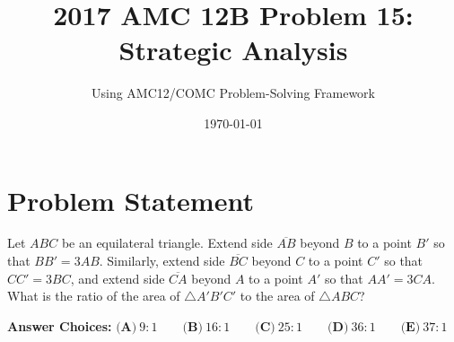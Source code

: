 \documentclass[11pt]{article}
\title{\textbf{2017 AMC 12B Problem 15: Strategic Analysis}}
\author{Using AMC12/COMC Problem-Solving Framework}
\date{\today}
\begin{document}
\maketitle

\section*{Problem Statement}
Let $ABC$ be an equilateral triangle. Extend side $\overline{AB}$ beyond $B$ to a point $B'$ so that $BB'=3AB$. Similarly, extend side $\overline{BC}$ beyond $C$ to a point $C'$ so that $CC'=3BC$, and extend side $\overline{CA}$ beyond $A$ to a point $A'$ so that $AA'=3CA$. What is the ratio of the area of $\triangle A'B'C'$ to the area of $\triangle ABC$?

\textbf{Answer Choices:} 
$\textbf{(A)}\ 9:1 \qquad\textbf{(B)}\ 16:1 \qquad\textbf{(C)}\ 25:1 \qquad\textbf{(D)}\ 36:1 \qquad\textbf{(E)}\ 37:1$
\end{document}
